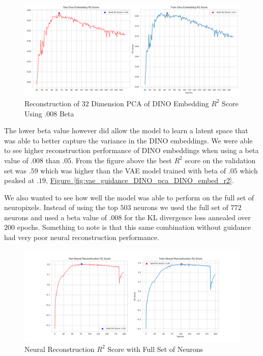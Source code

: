 \documentclass[12pt, letterpaper]{article}
\begin{document}
\begin{figure}[H]
    \centering
    \includegraphics[width=.9\textwidth]{.9_pca_DINO_embed_r2_128dim_503_top_var_200_epochs_0.008_beta_2_layer.png}
    \caption{Reconstruction of $32$ Dimension PCA of DINO Embedding $R^2$ Score Using .008 Beta}
    \label{fig:vae_guidance_DINO_pca_DINO_embed_r2_.008_beta}
\end{figure}

The lower beta value however did allow the model to learn a latent space that was able to better capture the variance in the DINO \cite{dino} embeddings. We were able to see higher reconstruction performance of DINO \cite{dino} embeddings when using a beta value of $.008$ than $.05$. From the figure above the best $R^2$ score on the validation set was $.59$ which was higher than the VAE model trained with beta of $.05$ which peaked at $.19$, \hyperref[fig:vae_guidance_DINO_pca_DINO_embed_r2]{Figure~\ref{fig:vae_guidance_DINO_pca_DINO_embed_r2}}. 

We also wanted to see how well the model was able to perform on the full set of neuropixels. Instead of using the top $503$ neurons we used the full set of $772$ neurons and used a beta value of $.008$ for the KL divergence loss annealed over $200$ epochs. Something to note is that this same combination without guidance had very poor neural reconstruction performance. 

\begin{figure}[H]
    \centering
    \includegraphics[width=1.0\textwidth]{x_r2_128dim_772_top_var_200_epochs_0.008_beta_2_layer_.9_pca_DINO_embed.png}
    \caption{Neural Reconstruction $R^2$ Score with Full Set of Neurons}
    \label{fig:vae_guidance_DINO_pca_full_neurons}
\end{figure}
\end{document}
